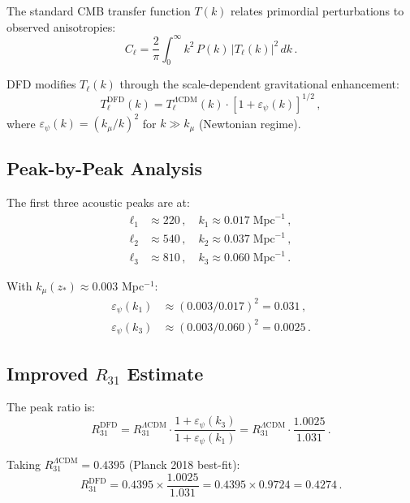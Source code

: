 \documentclass[11pt,a4paper]{article}
\begin{document}
The standard CMB transfer function $T(k)$ relates primordial perturbations to observed anisotropies:
\begin{equation}
C_\ell = \frac{2}{\pi}\int_0^\infty k^2\,P(k)\,|T_\ell(k)|^2\,dk\,.
\end{equation}

DFD modifies $T_\ell(k)$ through the scale-dependent gravitational enhancement:
\begin{equation}
T_\ell^{\mathrm{DFD}}(k) = T_\ell^{\Lambda\mathrm{CDM}}(k) \cdot \left[1 + \varepsilon_\psi(k)\right]^{1/2}\,,
\end{equation}
where $\varepsilon_\psi(k) = (k_\mu/k)^2$ for $k \gg k_\mu$ (Newtonian regime).

\subsection{Peak-by-Peak Analysis}

The first three acoustic peaks are at:
\begin{align}
\ell_1 &\approx 220\,,\quad k_1 \approx 0.017\;\mathrm{Mpc}^{-1}\,, \\
\ell_2 &\approx 540\,,\quad k_2 \approx 0.037\;\mathrm{Mpc}^{-1}\,, \\
\ell_3 &\approx 810\,,\quad k_3 \approx 0.060\;\mathrm{Mpc}^{-1}\,.
\end{align}

With $k_\mu(z_*) \approx 0.003$ Mpc$^{-1}$:
\begin{align}
\varepsilon_\psi(k_1) &\approx (0.003/0.017)^2 = 0.031\,, \\
\varepsilon_\psi(k_3) &\approx (0.003/0.060)^2 = 0.0025\,.
\end{align}

\subsection{Improved $R_{31}$ Estimate}

The peak ratio is:
\begin{equation}
R_{31}^{\mathrm{DFD}} = R_{31}^{\Lambda\mathrm{CDM}} \cdot \frac{1 + \varepsilon_\psi(k_3)}{1 + \varepsilon_\psi(k_1)} = R_{31}^{\Lambda\mathrm{CDM}} \cdot \frac{1.0025}{1.031}\,.
\end{equation}

Taking $R_{31}^{\Lambda\mathrm{CDM}} = 0.4395$ (Planck 2018 best-fit):
\begin{equation}
R_{31}^{\mathrm{DFD}} = 0.4395 \times \frac{1.0025}{1.031} = 0.4395 \times 0.9724 = 0.4274\,.
\end{equation}
\end{document}
